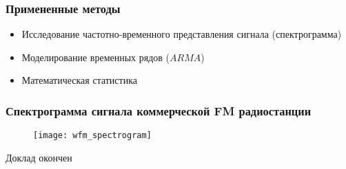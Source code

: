 \documentclass[14pt,russian]{beamer}
\begin{document}
\begin{frame}
  \frametitle{Примененные методы}
  \begin{itemize}
    \item{Исследование частотно-временного представления сигнала (спектрограмма)}
    \item{Моделирование временных рядов ($\mathit{ARMA}$)}
    \item{Математическая статистика}
  \end{itemize}
\end{frame}

\begin{frame}
  \frametitle{Спектрограмма сигнала коммерческой FM радиостанции}
  \begin{figure}
    \texttt{[image: wfm\_spectrogram]}
  \end{figure}
\end{frame}

\begin{frame}
  \begin{center}
    \Huge{Доклад окончен}
  \end{center}
\end{frame}
\end{document}
